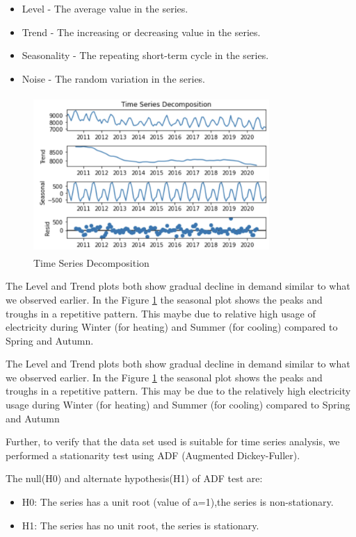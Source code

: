 \documentclass[mstat,12pt]{unswthesis}
\begin{document}
\begin{itemize}
  \item Level - The average value in the series.
  \item Trend - The increasing or decreasing value in the series.
  \item Seasonality - The repeating short-term cycle in the series.
  \item Noise - The random variation in the series.
\end{itemize}

\begin{figure}[H]
\centering
\includegraphics[width=0.80\textwidth,height=6cm]{time_series_conversion.png}
\caption{Time Series Decomposition}
\label{time_series_conversion}
\end{figure}

The Level and Trend plots both show gradual decline in demand similar to
what we observed earlier. In the Figure \ref{time_series_conversion} the
seasonal plot shows the peaks and troughs in a repetitive pattern. This
maybe due to relative high usage of electricity during Winter (for
heating) and Summer (for cooling) compared to Spring and Autumn.

The Level and Trend plots both show gradual decline in demand similar to
what we observed earlier. In the Figure \ref{time_series_conversion} the
seasonal plot shows the peaks and troughs in a repetitive pattern. This
may be due to the relatively high electricity usage during Winter (for
heating) and Summer (for cooling) compared to Spring and Autumn

Further, to verify that the data set used is suitable for time series
analysis, we performed a stationarity test using ADF (Augmented
Dickey-Fuller).

The null(H0) and alternate hypothesis(H1) of ADF test are:

\begin{itemize}
  \item H0: The series has a unit root (value of a=1),the series is non-stationary.
  \item H1: The series has no unit root, the series is stationary.
\end{itemize}
\end{document}
